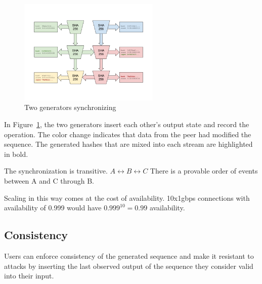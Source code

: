\documentclass[12pt]{article}
\begin{document}
\begin{figure}
  \begin{center}
    \centering
    \includegraphics[width=0.6\textwidth]{figures/fig_5.png}
    \caption[Fig 5]{Two generators synchronizing\label{fig:poh_scale}}
  \end{center}
  \end{figure}

In Figure~\ref{fig:poh_scale}, the two generators insert each other’s output state and record the operation.  The color change indicates that data from the peer had modified the sequence.  The generated hashes that are mixed into each stream are highlighted in bold.

The synchronization is transitive. \(A \leftrightarrow B \leftrightarrow C\)  There is a provable order of events between A and C through B.

Scaling in this way comes at the cost of availability.  10x1gbps connections with availability of 0.999 would have \(0.999^{10} = 0.99 \) availability.

\subsection{Consistency}
Users can enforce consistency of the generated sequence and make it resistant to attacks by inserting the last observed output of the sequence they consider valid into their input.\\
\end{document}
